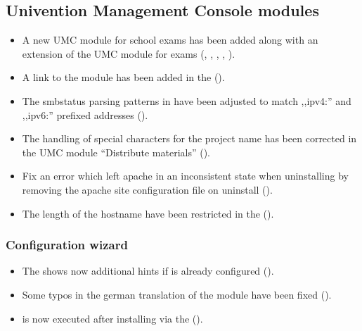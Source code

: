 \subsection{Univention Management Console modules}
\begin{itemize}
\item A new UMC module for school exams has been added along with an extension
  of the UMC  module for exams (,
  , , , ).
\item A link to the  module has been added in the  ().
\item The smbstatus parsing patterns in  have been adjusted to match ,,ipv4:'' and ,,ipv6:'' prefixed addresses ().
\item The handling of special characters for the project name has been corrected in the UMC module ``Distribute materials'' ().
\item Fix an error which left apache in an inconsistent state when uninstalling  by removing the  apache site configuration file on uninstall ().
\item The length of the hostname have been restricted in the  ().
\end{itemize}

\subsubsection{Configuration wizard}
\begin{itemize}
\item The  shows now additional hints if  is already configured ().
\item Some typos in the german translation of the  module have been fixed ().
\item {} is now executed after installing  via the  ().
\end{itemize}

